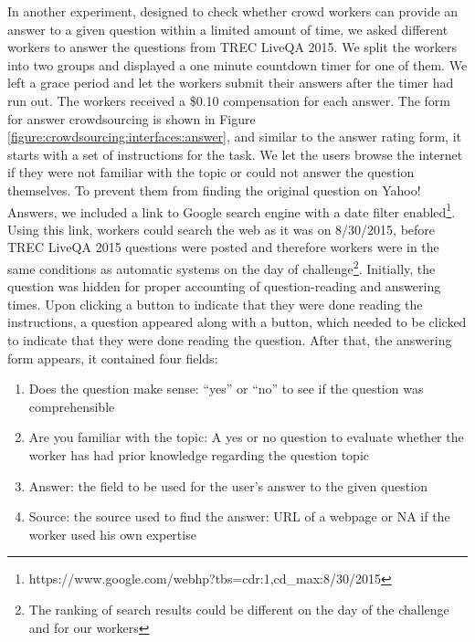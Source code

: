 In another experiment, designed to check whether crowd workers can provide an answer to a given question within a limited amount of time, we asked different workers to answer the questions from TREC LiveQA 2015.
We split the workers into two groups and displayed a one minute countdown timer for one of them.
We left a grace period and let the workers submit their answers after the timer had run out.
The workers received a \$0.10 compensation for each answer.
The form for answer crowdsourcing is shown in Figure \ref{figure:crowdsourcing:interfaces:answer}, and similar to the answer rating form, it starts with a set of instructions for the task.
We let the users browse the internet if they were not familiar with the topic or could not answer the question themselves.
To prevent them from finding the original question on Yahoo! Answers, we included a link to Google search engine with a date filter enabled\footnote{https://www.google.com/webhp?tbs=cdr:1,cd\_max:8/30/2015}.
Using this link, workers could search the web as it was on 8/30/2015, before TREC LiveQA 2015 questions were posted and therefore workers were in the same conditions as automatic systems on the day of challenge\footnote{The ranking of search results could be different on the day of the challenge and for our workers}.
Initially, the question was hidden for proper accounting of question-reading and answering times.
Upon clicking a button to indicate that they were done reading the instructions, a question appeared along with a button, which needed to be clicked to indicate that they were done reading the question.
After that, the answering form appears, it contained four fields:
\begin{enumerate}
\item Does the question make sense: ``yes'' or ``no'' to see if the question was comprehensible
\item Are you familiar with the topic: A yes or no question to evaluate whether the worker has had prior knowledge regarding the question topic
\item Answer: the field to be used for the user's answer to the given question
\item Source: the source used to find the answer: URL of a webpage or NA if the worker used his own expertise
\end{enumerate}

